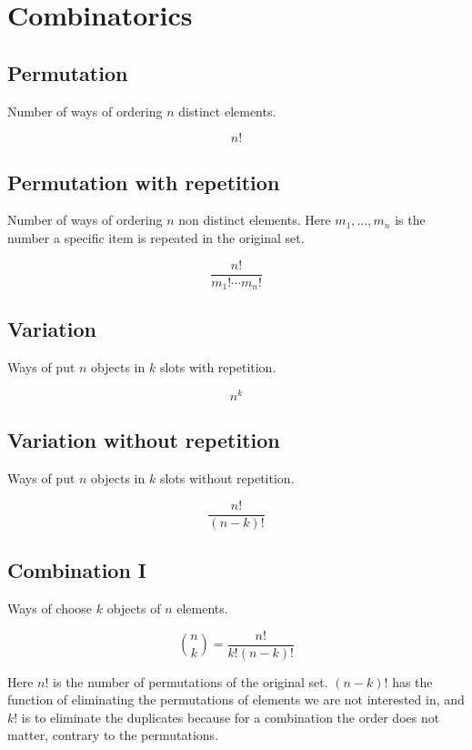 \newpage
\section{Combinatorics}

\subsection{Permutation}

Number of ways of ordering \(n\) distinct elements.

\[n!\]

\subsection{Permutation with repetition}

Number of ways of ordering \(n\) non distinct elements. Here \(m_1, \dots, m_n\)
is the number a specific item is repeated in the original set.

\[\frac{n!}{m_1! \cdots m_n!}\]

\subsection{Variation}

Ways of put \(n\) objects in \(k\) slots with repetition.

\[n^k\]

\subsection{Variation without repetition}

Ways of put \(n\) objects in \(k\) slots without repetition.

\[\frac{n!}{(n -k)!}\]

\subsection{Combination I}

Ways of choose \(k\) objects of \(n\) elements.

\[\binom{n}{k} = \frac{n!}{k!(n-k)!}\]

Here \(n!\) is the number of permutations of the original set.
\((n-k)!\) has the function of eliminating the permutations of elements we are not interested in, and
\(k!\) is to eliminate the duplicates because for a combination the order does not matter, contrary to
the permutations.

